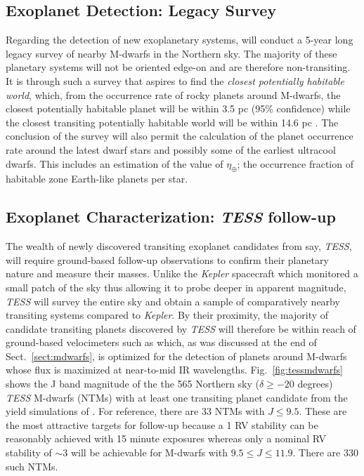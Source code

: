 \subsection{Exoplanet Detection: Legacy Survey} \label{sect:survey}
Regarding the detection of new exoplanetary systems, \spirou{} 
will conduct a 5-year long legacy survey of nearby M-dwarfs in the Northern 
sky. The majority of these planetary systems will not be oriented edge-on 
and are therefore 
non-transiting. It is through such a survey that \spirou{} aspires to find the 
\emph{closest potentially habitable world}, which, from the occurrence rate of 
rocky planets around M-dwarfs, the closest potentially habitable planet will 
be within 3.5 pc (95\% confidence) while the closest transiting potentially 
habitable world will be within 14.6 pc \parencite{dressing15a}. The conclusion of the 
survey will also permit the calculation of the planet occurrence rate around 
the latest dwarf stars and possibly some of the earliest ultracool dwarfs. This 
includes an estimation of the value of $\eta_{\oplus}$; the occurrence 
fraction of habitable zone Earth-like planets per star. 

\subsection{Exoplanet Characterization: \emph{TESS} follow-up}
The wealth of newly discovered 
transiting exoplanet candidates from say, \emph{TESS}, will 
require ground-based follow-up observations to confirm their planetary nature 
and measure their masses. 
Unlike the \emph{Kepler} spacecraft which monitored a small patch of the sky 
thus allowing it to probe deeper in apparent magnitude, 
\emph{TESS} will survey the entire sky and obtain a sample of 
comparatively nearby transiting systems compared to \emph{Kepler}. 
By their proximity, the 
majority of candidate transiting planets discovered by \emph{TESS} will 
therefore be within reach of ground-based velocimeters such as \spirou{,} 
which, as was discussed at the end of 
Sect.~\ref{sect:mdwarfs}, is optimized for the detection 
of planets around M-dwarfs whose flux is maximized at near-to-mid IR 
wavelengths. Fig.~\ref{fig:tessmdwarfs} shows the J band magnitude of the 
the 565 Northern sky ($\delta \geq -20$ degrees) \emph{TESS} M-dwarfs (NTMs) 
with at least one transiting planet candidate from the yield simulations 
of \cite{sullivan15}. 
For reference, there are 33 NTMs with $J \leq 9.5$. These are the most attractive 
targets for \spirou{} follow-up because a 1 \mps{} RV stability can be reasonably 
achieved with 15 minute exposures whereas only a nominal RV stability of 
$\sim 3$ \mps{} will be achievable for M-dwarfs with $9.5 \leq J \leq 11.9$. 
There are 330 such NTMs. \\

